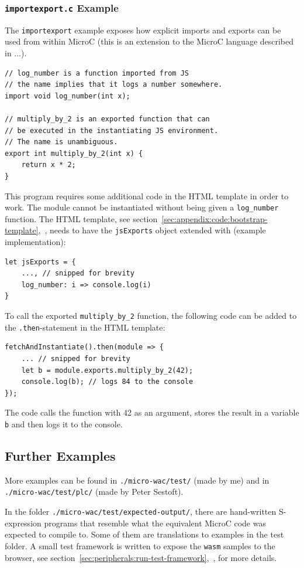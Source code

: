 \documentclass[a4paper]{article}
\begin{document}
\subsubsection{\texttt{importexport.c} Example}
The \texttt{importexport} example exposes how explicit imports and exports can be used from within MicroC (this is an extension to the MicroC language described in ...).%

\begin{verbatim}
// log_number is a function imported from JS
// the name implies that it logs a number somewhere.
import void log_number(int x);

// multiply_by_2 is an exported function that can
// be executed in the instantiating JS environment.
// The name is unambiguous.
export int multiply_by_2(int x) {
	return x * 2;
}
\end{verbatim}

This program requires some additional code in the HTML template in order to work. The module cannot be instantiated without being given a \texttt{log\_number} function. The HTML template, see section~\ref{sec:appendix:code:bootstrap-template},~, needs to have the \texttt{jsExports} object extended with (example implementation):
\begin{verbatim}
let jsExports = {
	..., // snipped for brevity
	log_number: i => console.log(i)
}
\end{verbatim}

To call the exported \texttt{multiply\_by\_2} function, the following code can be added to the \texttt{.then}-statement in the HTML template:
\begin{verbatim}
fetchAndInstantiate().then(module => {
	... // snipped for brevity
	let b = module.exports.multiply_by_2(42);
	console.log(b); // logs 84 to the console
});
\end{verbatim}
The code calls the function with 42 as an argument, stores the result in a variable \texttt{b} and then logs it to the console.

\subsection{Further Examples}
More examples can be found in \texttt{./micro-wac/test/} (made by me) and in \texttt{./micro-wac/test/plc/} (made by Peter Sestoft).

In the folder \texttt{./micro-wac/test/expected-output/}, there are hand-written S-expression programs that resemble what the equivalent MicroC code was expected to compile to. Some of them are translations to examples in the test folder. A small test framework is written to expose the \texttt{wasm} samples to the browser, see section~\ref{sec:peripherals:run-test-framework},~, for more details.
\end{document}
